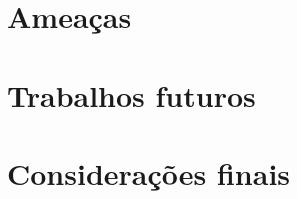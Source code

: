 \documentclass[12pt,openany,oneside,a4paper,english,brazil]{abntbibufjf}
\begin{document}
  \section{Ameaças}\label{sec:ameacas}

  \section{Trabalhos futuros}\label{sec:trabalhos_futuros}

  \section{Considerações finais}\label{sec:consideracoes_finais}






\postextual








\end{document}
